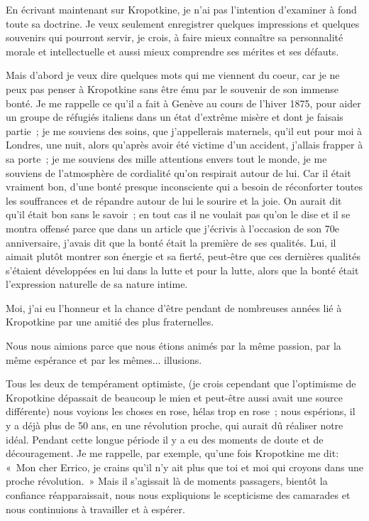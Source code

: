 \documentclass[french,twoside]{book} %
\begin{document}
En écrivant maintenant sur Kropotkine, je n’ai pas l’intention d’examiner à fond toute sa doctrine. Je veux seulement enregistrer quelques impressions et quelques souvenirs qui pourront servir, je crois, à faire mieux connaître sa personnalité morale et intellectuelle et aussi mieux comprendre ses mérites et ses défauts.\par
Mais d’abord je veux dire quelques mots qui me viennent du coeur, car je ne peux pas penser à Kropotkine sans être ému par le souvenir de son immense bonté. Je me rappelle ce qu’il a fait à Genève au cours de l’hiver 1875, pour aider un groupe de réfugiés italiens dans un état d’extrême misère et dont je faisais partie ; je me souviens des soins, que j’appellerais maternels, qu’il eut pour moi à Londres, une nuit, alors qu’après avoir été victime d’un accident, j’allais frapper à sa porte ; je me souviens des mille attentions envers tout le monde, je me souviens de l’atmosphère de cordialité qu’on respirait autour de lui. Car il était vraiment bon, d’une bonté presque inconsciente qui a besoin de réconforter toutes les souffrances et de répandre autour de lui le sourire et la joie. On aurait dit qu’il était bon sans le savoir ; en tout cas il ne voulait pas qu’on le dise et il se montra offensé parce que dans un article que j’écrivis à l’occasion de son 70e anniversaire, j’avais dit que la bonté était la première de ses qualités. Lui, il aimait plutôt montrer son énergie et sa fierté, peut-être que ces dernières qualités s’étaient développées en lui dans la lutte et pour la lutte, alors que la bonté était l’expression naturelle de sa nature intime.\par
Moi, j’ai eu l’honneur et la chance d’être pendant de nombreuses années lié à Kropotkine par une amitié des plus fraternelles.\par
Nous nous aimions parce que nous étions animés par la même passion, par la même espérance et par les mêmes... illusions.\par
Tous les deux de tempérament optimiste, (je crois cependant que l’optimisme de Kropotkine dépassait de beaucoup le mien et peut-être aussi avait une source différente) nous voyions les choses en rose, hélas trop en rose ; nous espérions, il y a déjà plus de 50 ans, en une révolution proche, qui aurait dû réaliser notre idéal. Pendant cette longue période il y a eu des moments de doute et de découragement. Je me rappelle, par exemple, qu’une fois Kropotkine me dit: « Mon cher Errico, je crains qu’il n’y ait plus que toi et moi qui croyons dans une proche révolution. » Mais il s’agissait là de moments passagers, bientôt la confiance réapparaissait, nous nous expliquions le scepticisme des camarades et nous continuions à travailler et à espérer.\par
\end{document}
